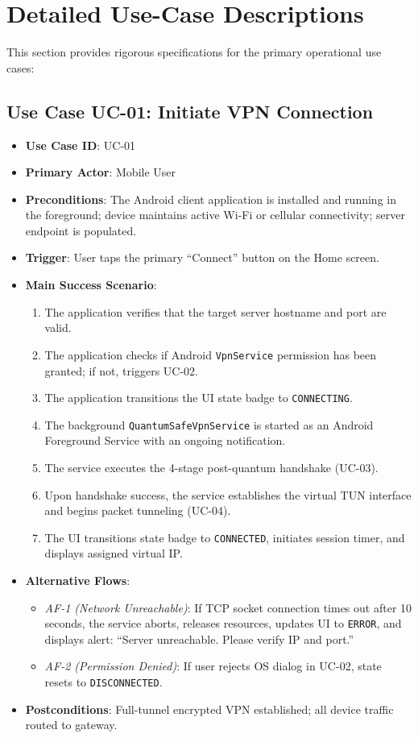 \section{Detailed Use-Case Descriptions}
\label{sec:detailed_use_cases}

This section provides rigorous specifications for the primary operational use cases:

\subsection{Use Case UC-01: Initiate VPN Connection}
\begin{itemize}
    \item \textbf{Use Case ID}: UC-01
    \item \textbf{Primary Actor}: Mobile User
    \item \textbf{Preconditions}: The Android client application is installed and running in the foreground; device maintains active Wi-Fi or cellular connectivity; server endpoint is populated.
    \item \textbf{Trigger}: User taps the primary ``Connect'' button on the Home screen.
    \item \textbf{Main Success Scenario}:
    \begin{enumerate}
        \item The application verifies that the target server hostname and port are valid.
        \item The application checks if Android \texttt{VpnService} permission has been granted; if not, triggers UC-02.
        \item The application transitions the UI state badge to \texttt{CONNECTING}.
        \item The background \texttt{QuantumSafeVpnService} is started as an Android Foreground Service with an ongoing notification.
        \item The service executes the 4-stage post-quantum handshake (UC-03).
        \item Upon handshake success, the service establishes the virtual TUN interface and begins packet tunneling (UC-04).
        \item The UI transitions state badge to \texttt{CONNECTED}, initiates session timer, and displays assigned virtual IP.
    \end{enumerate}
    \item \textbf{Alternative Flows}:
    \begin{itemize}
        \item \textit{AF-1 (Network Unreachable)}: If TCP socket connection times out after 10 seconds, the service aborts, releases resources, updates UI to \texttt{ERROR}, and displays alert: ``Server unreachable. Please verify IP and port.''
        \item \textit{AF-2 (Permission Denied)}: If user rejects OS dialog in UC-02, state resets to \texttt{DISCONNECTED}.
    \end{itemize}
    \item \textbf{Postconditions}: Full-tunnel encrypted VPN established; all device traffic routed to gateway.
\end{itemize}

